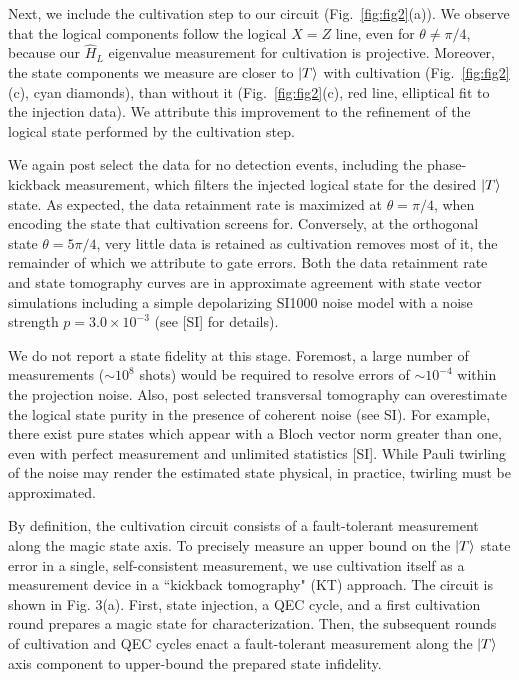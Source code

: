 \documentclass[%
 reprint,
 amsmath,amssymb,
 aps,
]{revtex4-2}
\begin{document}
Next, we include the cultivation step to our circuit (Fig.~\ref{fig:fig2}(a)). We observe that the logical components follow the logical $X = Z$ line, even for $\theta \neq \pi/4$, because our $\hat{H}_L$ eigenvalue measurement for cultivation is projective. Moreover, the state components we measure are closer to $\ket{T}$ with cultivation (Fig.~\ref{fig:fig2}(c), cyan diamonds), than without it (Fig.~\ref{fig:fig2}(c), red line, elliptical fit to the injection data). We attribute this improvement to the refinement of the logical state performed by the cultivation step. 

We again post select the data for no detection events, including the phase-kickback measurement, which filters the injected logical state for the desired $\ket{T}$ state.
As expected, the data retainment rate is maximized at $\theta = \pi/4$, when encoding the state that cultivation screens for. Conversely, at the orthogonal state $\theta = 5\pi/4$, very little data is retained as cultivation removes most of it, the remainder of which we attribute to gate errors. Both the data retainment rate and state tomography curves are in approximate agreement with state vector simulations including a simple depolarizing SI1000 noise model \cite{gidney_fault-tolerant_2021} with a noise strength $p = 3.0 \times 10^{-3}$ (see [SI] for details).

We do not report a state fidelity at this stage. Foremost, a large number of measurements ($\sim 10^8$ shots) would be required to resolve errors of $\sim 10^{-4}$ within the projection noise.  Also, post selected transversal tomography can overestimate the logical state purity in the presence of coherent noise (see SI). For example, there exist pure states which appear with a Bloch vector norm greater than one, even with perfect measurement and unlimited statistics [SI]. While Pauli twirling of the noise may render the estimated state physical, in practice, twirling must be approximated. 

By definition, the cultivation circuit consists of a fault-tolerant measurement along the magic state axis. To precisely measure an upper bound on the $\ket{T}$ state error in a single, self-consistent measurement, we use cultivation itself as a  measurement device in a ``kickback tomography" (KT) approach. The circuit is shown in Fig. 3(a). First, state injection, a QEC cycle, and a first cultivation round prepares a magic state for characterization. Then, the subsequent rounds of cultivation and QEC cycles enact a fault-tolerant measurement along the $\ket{T}$ axis component to upper-bound the prepared state infidelity. 
\end{document}
